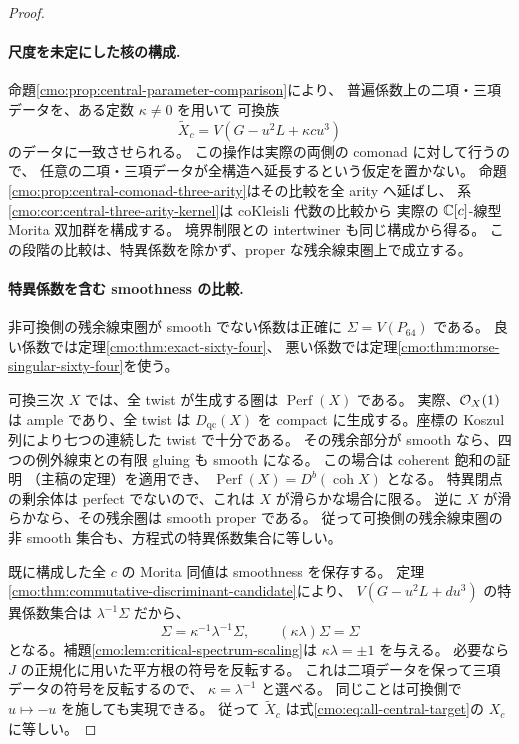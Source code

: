 \begin{proof}
\paragraph{尺度を未定にした核の構成.}
命題\ref{cmo:prop:central-parameter-comparison}により、
普遍係数上の二項・三項データを、ある定数 $\kappa\ne0$ を用いて
可換族
\[
 \widetilde X_c=V(G-u^2L+\kappa cu^3)
\]
のデータに一致させられる。
この操作は実際の両側の comonad に対して行うので、
任意の二項・三項データが全構造へ延長するという仮定を置かない。
命題\ref{cmo:prop:central-comonad-three-arity}はその比較を全 arity へ延ばし、
系\ref{cmo:cor:central-three-arity-kernel}は coKleisli 代数の比較から
実際の $\mathbb C[c]$-線型 Morita 双加群を構成する。
境界制限との intertwiner も同じ構成から得る。
この段階の比較は、特異係数を除かず、proper な残余線束圏上で成立する。

\paragraph{特異係数を含む smoothness の比較.}
非可換側の残余線束圏が smooth でない係数は正確に
$\Sigma=V(P_{64})$ である。
良い係数では定理\ref{cmo:thm:exact-sixty-four}、
悪い係数では定理\ref{cmo:thm:morse-singular-sixty-four}を使う。

可換三次 $X$ では、全 twist が生成する圏は $\operatorname{Perf}(X)$ である。
実際、$\mathcal O_X(1)$ は ample であり、全 twist は $D_{\mathrm{qc}}(X)$ を
compact に生成する。座標の Koszul 列により七つの連続した twist で十分である。
その残余部分が smooth なら、四つの例外線束との有限 gluing も smooth になる。
この場合は coherent 飽和の証明
（主稿の定理）を適用でき、
$\operatorname{Perf}(X)=D^b(\operatorname{coh}X)$ となる。
特異閉点の剰余体は perfect でないので、これは $X$ が滑らかな場合に限る。
逆に $X$ が滑らかなら、その残余圏は smooth proper である。
従って可換側の残余線束圏の非 smooth 集合も、方程式の特異係数集合に等しい。

既に構成した全 $c$ の Morita 同値は smoothness を保存する。
定理\ref{cmo:thm:commutative-discriminant-candidate}により、
$V(G-u^2L+du^3)$ の特異係数集合は $\lambda^{-1}\Sigma$ だから、
\[
 \Sigma=\kappa^{-1}\lambda^{-1}\Sigma,\qquad
 (\kappa\lambda)\Sigma=\Sigma
\]
となる。補題\ref{cmo:lem:critical-spectrum-scaling}は
$\kappa\lambda=\pm1$ を与える。
必要なら $J$ の正規化に用いた平方根の符号を反転する。
これは二項データを保って三項データの符号を反転するので、
$\kappa=\lambda^{-1}$ と選べる。
同じことは可換側で $u\mapsto-u$ を施しても実現できる。
従って $\widetilde X_c$ は式\eqref{cmo:eq:all-central-target}の $X_c$ に等しい。


\end{proof}
